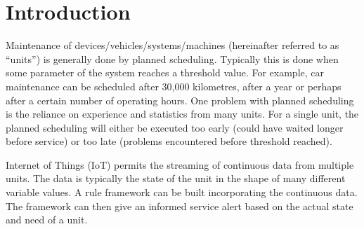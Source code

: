 \chapter{Introduction}
\label{cha:introduction}



Maintenance of devices/vehicles/systems/machines (hereinafter referred to as “units”) is generally done by planned scheduling. 
Typically this is done when some parameter of the system reaches a threshold value. 
For example, car maintenance can be scheduled after 30,000 kilometres, after a year or perhaps after a certain number of operating hours.
One problem with planned scheduling is the reliance on experience and statistics from many units.
For a single unit, the planned scheduling will either be executed too early (could have waited longer before service) or too late (problems encountered before threshold reached).

Internet of Things (IoT) permits the streaming of continuous data from multiple units.
The data is typically the state of the unit in the shape of many different variable values.
A rule framework can be built incorporating the continuous data.
The framework can then give an informed service alert based on the actual state and need of a unit.

